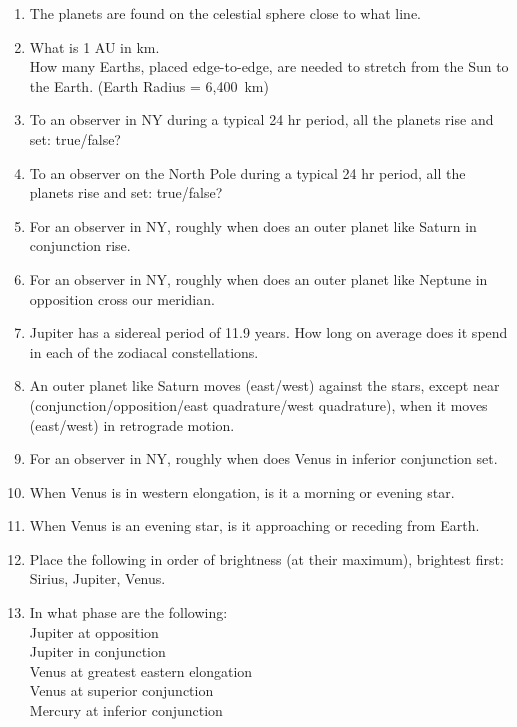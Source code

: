 \begin{enumerate} 

\item 
The planets are found on the celestial sphere close to what line. 

\item 
What is 1 AU in km. \\
How many Earths, placed edge-to-edge, are needed to stretch from the
Sun to the Earth. (Earth Radius = 6,400~km)

\item 
To an observer in NY during a typical 24 hr period, all the
planets rise and set: true/false?

\item 
To an observer on the North Pole during a typical 24 hr period, all the
planets rise and set: true/false?

\item 
For an observer in NY, roughly when does an outer planet like Saturn in
conjunction rise.

\item 
For an observer in NY, roughly when does an outer planet like Neptune in
opposition cross our meridian.

\item
Jupiter has a sidereal period of 11.9 years. How long on average does
it spend in each of the zodiacal constellations.

\item
An outer planet like Saturn moves (east/west) against the stars,
except near (conjunction/opposition/east quadrature/west quadrature),
when it moves (east/west) in retrograde motion.

\item
For an observer in NY, roughly when does Venus in inferior conjunction
set.

\item
When Venus is in western elongation, is it a morning or evening star.


\item
When Venus is an evening star, is it approaching or receding from
Earth.

\item
Place the following in order of brightness
(at their maximum), brightest first: Sirius, Jupiter, Venus.

\item
In what phase are the following: \\
Jupiter at opposition \\
Jupiter in conjunction \\
Venus at greatest eastern elongation \\
Venus at superior conjunction \\
Mercury at inferior conjunction


\end{enumerate}
